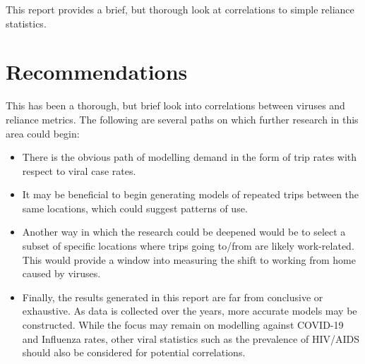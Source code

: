 \documentclass[11pt]{article}
\begin{document}
This report provides a brief, but thorough look at correlations to simple reliance statistics.


\section{Recommendations}
This has been a thorough, but brief look into correlations between viruses and reliance metrics.
The following are several paths on which further research in this area could begin:
\begin{itemize}
    \item There is the obvious path of modelling demand in the form of trip rates with respect to viral case rates. 
    \item It may be beneficial to begin generating models of repeated trips between the same locations,
    which could suggest patterns of use.
    \item Another way in which the research could be deepened would be to select a subset of specific locations where trips going to/from are likely work-related. 
    This would provide a window into measuring the shift to working from home caused by viruses.
    \item Finally, the results generated in this report are far from conclusive or exhaustive.
    As data is collected over the years, more accurate models may be constructed. 
    While the focus may remain on modelling against COVID-19 and Influenza rates, 
    other viral statistics such as the prevalence of HIV/AIDS should also be considered for potential correlations.
\end{itemize}

\clearpage

\printbibliography
\end{document}
